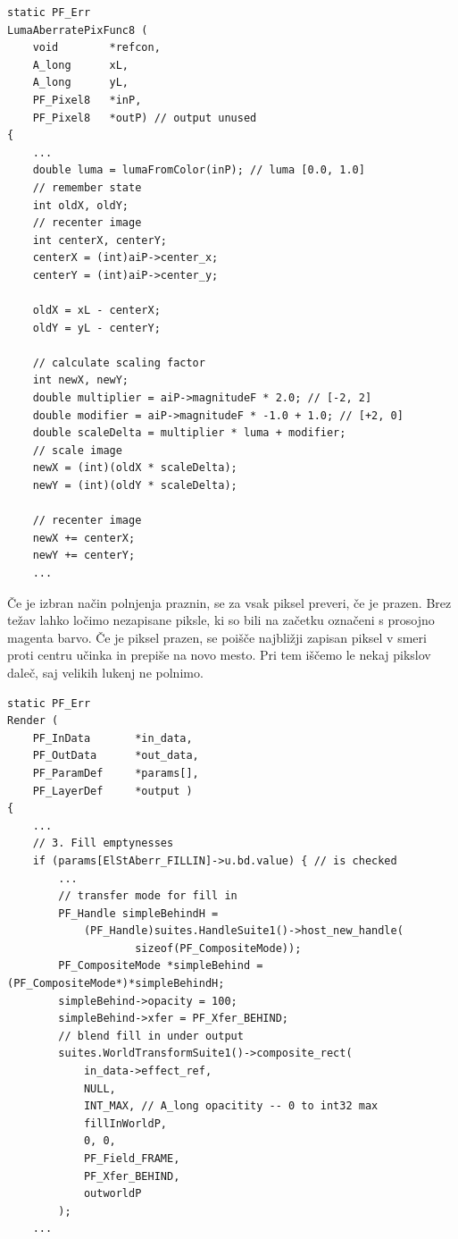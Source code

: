 \documentclass[a4paper, 12pt]{book}
\begin{document}
\begin{verbatim}
static PF_Err
LumaAberratePixFunc8 (
    void        *refcon, 
    A_long      xL, 
    A_long      yL, 
    PF_Pixel8   *inP, 
    PF_Pixel8   *outP) // output unused
{
    ...
    double luma = lumaFromColor(inP); // luma [0.0, 1.0]
    // remember state
    int oldX, oldY;
    // recenter image
    int centerX, centerY;
    centerX = (int)aiP->center_x;
    centerY = (int)aiP->center_y;

    oldX = xL - centerX;
    oldY = yL - centerY;

    // calculate scaling factor
    int newX, newY;
    double multiplier = aiP->magnitudeF * 2.0; // [-2, 2]
    double modifier = aiP->magnitudeF * -1.0 + 1.0; // [+2, 0]
    double scaleDelta = multiplier * luma + modifier;
    // scale image
    newX = (int)(oldX * scaleDelta);
    newY = (int)(oldY * scaleDelta);

    // recenter image
    newX += centerX;
    newY += centerY;
    ...
\end{verbatim}

Če je izbran način polnjenja praznin, se za vsak piksel preveri, če je prazen.
Brez težav lahko ločimo nezapisane piksle, ki so bili na začetku označeni s prosojno magenta barvo.
Če je piksel prazen, se poišče najbližji zapisan piksel v smeri proti centru učinka in prepiše na novo mesto.
Pri tem iščemo le nekaj pikslov daleč, saj velikih lukenj ne polnimo.

\begin{verbatim}
static PF_Err 
Render (
    PF_InData       *in_data,
    PF_OutData      *out_data,
    PF_ParamDef     *params[],
    PF_LayerDef     *output )
{
    ...
    // 3. Fill emptynesses
    if (params[ElStAberr_FILLIN]->u.bd.value) { // is checked
        ...
        // transfer mode for fill in
        PF_Handle simpleBehindH = 
            (PF_Handle)suites.HandleSuite1()->host_new_handle(
                    sizeof(PF_CompositeMode));
        PF_CompositeMode *simpleBehind = (PF_CompositeMode*)*simpleBehindH;
        simpleBehind->opacity = 100;
        simpleBehind->xfer = PF_Xfer_BEHIND;
        // blend fill in under output
        suites.WorldTransformSuite1()->composite_rect(
            in_data->effect_ref,
            NULL,
            INT_MAX, // A_long opacitity -- 0 to int32 max
            fillInWorldP,
            0, 0,
            PF_Field_FRAME,
            PF_Xfer_BEHIND,
            outworldP
        );
    ...
\end{verbatim}
\end{document}
